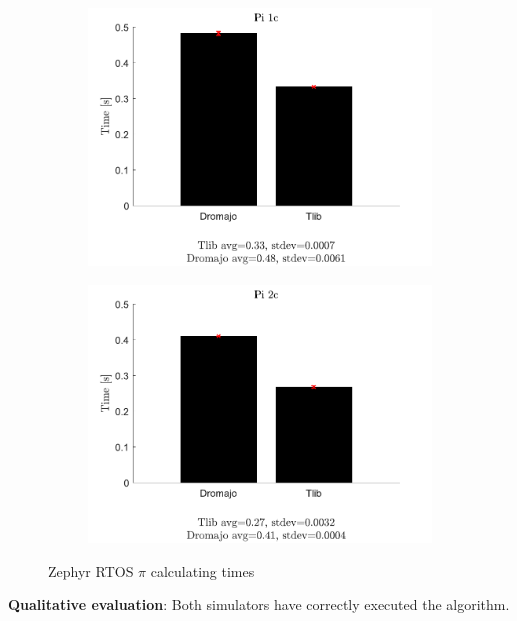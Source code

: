 \begin{figure}[h]
    \centering
    \begin{subfigure}{0.5\textwidth}
      \centering
      \includegraphics[width=1.2\linewidth]{figures/benchmarks/Pi1c.pdf}
    \end{subfigure}%
    \begin{subfigure}{0.5\textwidth}
      \centering
      \includegraphics[width=1.2\linewidth]{figures/benchmarks/Pi2c.pdf}
    \end{subfigure}
    \caption{Zephyr RTOS $\pi$ calculating times}
\end{figure}
\textbf{Qualitative evaluation}: Both simulators have correctly executed the algorithm.

